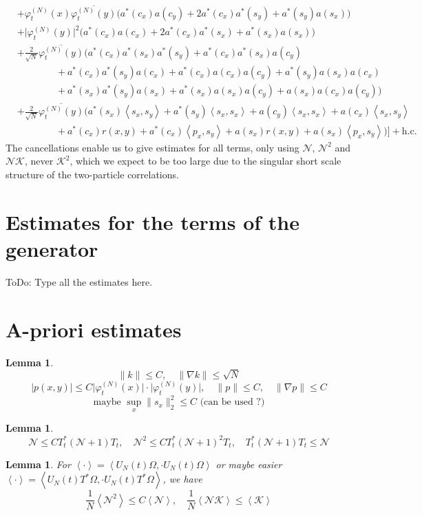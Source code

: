 \documentclass[11pt,a4paper,twoside,headsepline]{scrartcl}
\newtheorem{lem}[thm]{Lemma}
\newcommand{\Ncal}{\mathcal{N}}		%
\newcommand{\Kcal}{\mathcal{K}}		%
\newcommand{\hc}{\mbox{h.c.}}		%
\newcommand{\scal}[2]{\left<#1,#2\right>} %
\newcommand{\cc}[1]{\overline{#1}}	%
\newcommand{\norm}[1]{\lVert#1\rVert}	%
\newcommand{\ev}[1]{\left<#1\right>}	%
\newcommand{\ph}{\varphi_t^{(N)}}	%
\newcommand{\bd}{\begin{displaymath}}			%
\newcommand{\ed}{\end{displaymath}}
\begin{document}
\begin{align}
& + \ph(x) \cc{\ph(y)} \Big( a^*(c_x) a(c_y) + 2 a^*(c_x) a^*(s_y) + a^*(s_y) a(s_x) \Big) \\
& + \lvert \ph(y) \rvert^2 \Big( a^*(c_x) a(c_x) + 2 a^*(c_x) a^*(s_x) + a^*(s_x) a(s_x) \Big) \\
& + \frac{2}{\sqrt{N}}\cc{\ph(y)} \bigg(    a^*(c_x) a^*(s_x) a^*(s_y) + a^*(c_x) a^*(s_x) a(c_y) \\
					    & \qquad\qquad + a^*(c_x) a^*(s_y) a(c_x) + a^*(c_x) a(c_x) a(c_y) + a^*(s_y) a(s_x) a(c_x)\\
					    & \qquad\qquad + a^*(s_x) a^*(s_y) a(s_x) + a^*(s_x) a(s_x) a(c_y) + a(s_x) a(c_x) a(c_y)  \bigg) \\
& + \frac{2}{\sqrt{N}}\cc{\ph(y)} \bigg(    a^*(s_x) \scal{s_x}{s_y} + a^*(s_y) \scal{s_x}{s_x}  + a(c_y) \scal{s_x}{s_x} + 							a(c_x) \scal{s_x}{s_y} \\
					    & \qquad\qquad + a^*(c_x)r(x,y) + a^*(c_x)\scal{p_x}{s_y} + a(s_x)r(x,y) + 			a(s_x)\scal{p_x}{s_y}		\bigg)    \Big] + \hc
\end{align}
The cancellations enable us to give estimates for all terms, only using $\Ncal$, $\Ncal^2$ and $\Ncal \Kcal$, never $\Kcal^2$, which we expect to be too large due to the singular short scale structure of the two-particle correlations.

\section{Estimates for the terms of the generator}
ToDo: Type all the estimates here.

\section{A-priori estimates}
\begin{lem}
 \bd
  \norm{k} \leq C, \quad \norm{\nabla k} \leq \sqrt{N}
 \ed
 \bd
  \lvert p(x,y) \rvert \leq C \lvert \ph(x) \rvert\cdot \lvert \ph(y) \rvert, \quad \norm{p} \leq C, \quad \norm{\nabla p} \leq C
 \ed
\bd
\mbox{maybe } \sup_x \norm{s_x}_2^2 \leq C \mbox{ (can be used ?)}
\ed
\end{lem}

\begin{lem}
\bd
\Ncal \leq C T^*_t (\Ncal + 1) T_t, \quad \Ncal^2 \leq C T^*_t (\Ncal + 1)^2 T_t, \quad T^*_t (\Ncal + 1) T_t \leq \Ncal
\ed
\end{lem}


\begin{lem}
\label{lem:nsquaredbound}
For $\ev{\cdot} = \scal{U_N(t)\Omega}{\cdot U_N(t)\Omega}$ or maybe easier $\ev{\cdot} = \scal{U_N(t)T^*\Omega}{\cdot U_N(t)T^*\Omega}$, we have
 \bd
 \frac{1}{N}\ev{\Ncal^2} \leq C \ev{\Ncal}, \quad \frac{1}{N}\ev{\Ncal \Kcal} \leq \ev{\Kcal}
 \ed
\end{lem}
\end{document}
